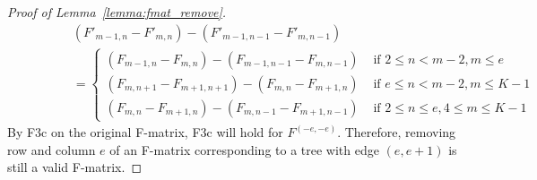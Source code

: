 \documentclass{article}
\begin{document}
\begin{proof}[Proof of Lemma~\ref{lemma:fmat_remove}]
\begin{align*}
     &(F'_{m-1, n} - F'_{m,n}) - (F'_{m-1, n-1}- F'_{m,n-1})\\
     \qquad \qquad &= \begin{cases}
    (F_{m-1, n} - F_{m,n}) - (F_{m-1, n-1}- F_{m,n-1}) & \text{ if } 2\leq n < m-2, m \leq e \\
    (F_{m, n+1} - F_{m+1,n+1}) - (F_{m, n}- F_{m+1,n}) & \text{ if } e\leq n < m-2, m \leq K-1 \\
    (F_{m, n} - F_{m+1,n}) - (F_{m, n-1}- F_{m+1,n-1}) & \text{ if } 2 \leq n\leq e, 4 \leq m \leq K-1 
    \end{cases} 
\end{align*}
By F3c on the original F-matrix, F3c will hold for $F^{(-e, -e)}$. Therefore, removing row and column $e$ of an F-matrix corresponding to a tree with edge $(e, e+1)$ is still a valid F-matrix. 
\end{proof}
\end{document}
